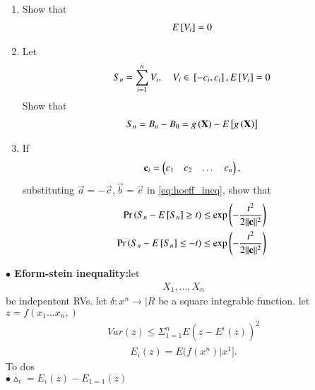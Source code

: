 \documentclass[journal,12pt,twocolumn]{IEEEtran}
\renewcommand\thesection{\arabic{section}}
\begin{document}
\begin{enumerate}[label=\thesection.\arabic*,ref=\thesection.\theenumi]
\item Show that 
\begin{align}
 E{}\left[V_i\right]  = 0
\end{align}
\item Let
\begin{align}
S_n=\sum_{i=1}^{n} V_i, \quad V_i \in {}\left[-c_i,c_i\right], E{}\left[V_i\right]  = 0
\end{align}
%
Show that
\begin{align}
S_n = B_n - B_0 = g\left(\mathbf{X}\right)-E{}\left[g\left(\mathbf{X}\right)\right]
\end{align}
\item If 
\begin{align}
\mathbf{c}_i = \begin{pmatrix}c_1 & c_2 & \dots & c_n\end{pmatrix},
\end{align}
substituting $\vec{a} = -\vec{c}, \vec{b} = \vec{c}$ in \eqref{eq:hoeff_ineq}, show that
\begin{align}
\label{eq:mcdiarmid}
\Pr\left(S_n- E{}\left[S_n\right] \ge t\right) &\le \exp\left(-\frac{t^2}{2\lVert\mathbf{c}\rVert^2}\right)
\\
\Pr\left(S_n- E{}\left[S_n\right] \le -t\right) &\le \exp\left(-\frac{t^2}{2\lVert\mathbf{c}\rVert^2}\right)
\end{align}
%

\end{enumerate}
\textbf{$\bullet$ Eform-stein inequality:}let
\begin{align}
X_1, \dots, X_n
\end{align}
be indepentent RVs. let $\delta:x^n\rightarrow |R$ be a square integrable function. let $z=f(x_1...x_n,)$\\
\begin{align}
Var(z)\leqslant \Sigma_{1=1}^{n} E(z-E^i(z))^2
\end{align}
\begin{align}
E_i(z)=E(f(x^n)|x^1].
\end{align}
To dos\\
$\bullet \vartriangle_i=E_i(z)-E_{1=1}(z)$\\
\end{document}
